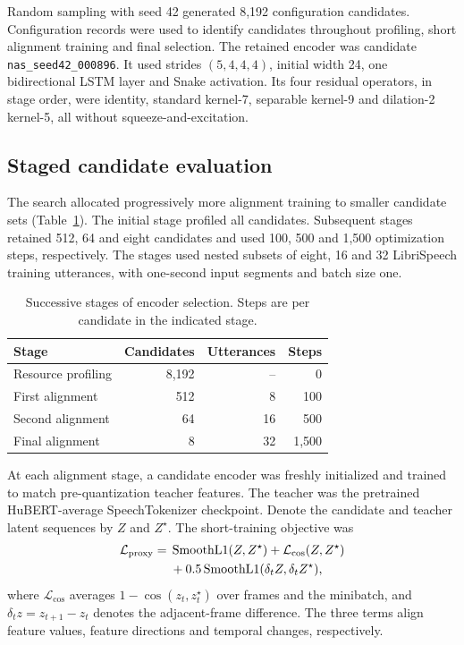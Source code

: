 Random sampling with seed 42 generated 8,192 configuration candidates. Configuration records were used to identify candidates throughout profiling, short alignment training and final selection. The retained encoder was candidate \texttt{nas\_seed42\_000896}. It used strides $(5,4,4,4)$, initial width 24, one bidirectional LSTM layer and Snake activation. Its four residual operators, in stage order, were identity, standard kernel-7, separable kernel-9 and dilation-2 kernel-5, all without squeeze-and-excitation.

\subsection{Staged candidate evaluation}
The search allocated progressively more alignment training to smaller candidate sets (Table~\ref{tab:sv2-search}). The initial stage profiled all candidates. Subsequent stages retained 512, 64 and eight candidates and used 100, 500 and 1,500 optimization steps, respectively. The stages used nested subsets of eight, 16 and 32 LibriSpeech training utterances, with one-second input segments and batch size one.

\begin{table}[t]
\centering
\caption{Successive stages of encoder selection. Steps are per candidate in the indicated stage.}
\label{tab:sv2-search}
\small
\begin{tabular}{@{}lrrr@{}}
\toprule
Stage & Candidates & Utterances & Steps\\
\midrule
Resource profiling & 8,192 & -- & 0\\
First alignment & 512 & 8 & 100\\
Second alignment & 64 & 16 & 500\\
Final alignment & 8 & 32 & 1,500\\
\bottomrule
\end{tabular}
\end{table}

At each alignment stage, a candidate encoder was freshly initialized and trained to match pre-quantization teacher features. The teacher was the pretrained HuBERT-average SpeechTokenizer checkpoint. Denote the candidate and teacher latent sequences by $Z$ and $Z^\star$. The short-training objective was
\begin{equation}
\begin{split}
 \mathcal L_{\rm proxy}={}&
 \operatorname{SmoothL1}(Z,Z^\star)
 +\mathcal L_{\cos}(Z,Z^\star)\\
 &+0.5\operatorname{SmoothL1}
      (\delta_t Z,\delta_t Z^\star),
\end{split}
\label{eq:sv2-proxy}
\end{equation}
where $\mathcal L_{\cos}$ averages $1-\cos(z_t,z_t^\star)$ over frames and the minibatch, and $\delta_t z=z_{t+1}-z_t$ denotes the adjacent-frame difference. The three terms align feature values, feature directions and temporal changes, respectively.

